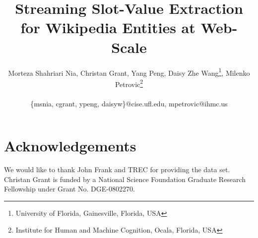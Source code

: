 \documentclass[letterpaper]{article}
\begin{document}
\title{Streaming Slot-Value Extraction for Wikipedia Entities at Web-Scale}





\author{Morteza Shahriari Nia, Christan Grant, Yang Peng, Daisy Zhe Wang\footnote{University of Florida, Gainesville, Florida, USA}, Milenko Petrovic\footnote{Institute for Human and Machine Cognition, Ocala, Florida, USA}\\
       \\
       {\{msnia, cgrant, ypeng, daisyw\}@cise.ufl.edu,}
       {mpetrovic@ihmc.us}
}

\maketitle







%





%

\section*{Acknowledgements}
We would like to thank John Frank and TREC for providing the data set.
Christan Grant is funded by a National Science Foundation Graduate Research Fellowship under Grant No. DGE-0802270. 

%
%




%
\end{document}
